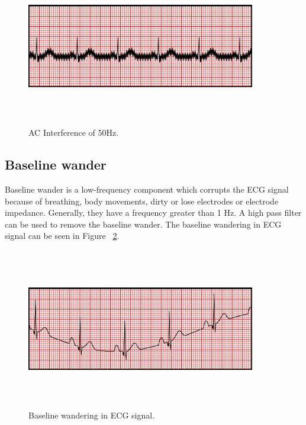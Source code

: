 \begin{figure}[htpb]
	\centering
	\includegraphics[width=10cm,height=7cm,keepaspectratio=true]{images/ACInterference}
	\caption{
		AC Interference of 50Hz\cite{ecg_artifacts}.
	}
	\label{fig:ACInterference}
\end{figure}

\subsection{Baseline wander}
Baseline wander is a low-frequency component which corrupts the ECG signal because of breathing, body movements, dirty or lose electrodes or electrode impedance. Generally, they have a frequency greater than 1 Hz. A high pass filter can be used to remove the baseline wander. The baseline wandering in ECG signal can be seen in Figure ~\ref{fig:WBaseline}.

\begin{figure}[htpb]
	\centering
	\includegraphics[width=10cm,height=7cm,keepaspectratio=true]{images/WBaseline}
	\caption{
		Baseline wandering in ECG signal\cite{ecg_artifacts}.
	}
	\label{fig:WBaseline}
\end{figure}

